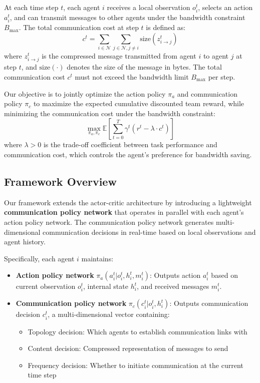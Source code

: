 \documentclass[10pt, twocolumn]{IEEEtran}
\begin{document}
At each time step $t$, each agent $i$ receives a local observation $o_i^t$, selects an action $a_i^t$, and can transmit messages to other agents under the bandwidth constraint $B_{\max}$. The total communication cost at step $t$ is defined as:
\begin{equation}
c^t = \sum_{i \in \mathcal{N}} \sum_{j \in \mathcal{N}, j \neq i} \text{size}(z_{i \to j}^t)
\end{equation}
where $z_{i \to j}^t$ is the compressed message transmitted from agent $i$ to agent $j$ at step $t$, and $\text{size}(\cdot)$ denotes the size of the message in bytes. The total communication cost $c^t$ must not exceed the bandwidth limit $B_{\max}$ per step.

Our objective is to jointly optimize the action policy $\pi_a$ and communication policy $\pi_c$ to maximize the expected cumulative discounted team reward, while minimizing the communication cost under the bandwidth constraint:
\begin{equation}
\max_{\pi_a, \pi_c} \mathbb{E}\left[\sum_{t=0}^{T} \gamma^t \left(r^t - \lambda \cdot c^t\right)\right]
\end{equation}
where $\lambda > 0$ is the trade-off coefficient between task performance and communication cost, which controls the agent's preference for bandwidth saving.

\subsection{Framework Overview}
Our framework extends the actor-critic architecture by introducing a lightweight \textbf{communication policy network} that operates in parallel with each agent's action policy network. The communication policy network generates multi-dimensional communication decisions in real-time based on local observations and agent history.

Specifically, each agent $i$ maintains:
\begin{itemize}
    \item \textbf{Action policy network} $\pi_a(a_i^t | o_i^t, h_i^t, m_i^t)$: Outputs action $a_i^t$ based on current observation $o_i^t$, internal state $h_i^t$, and received messages $m_i^t$.
    
    \item \textbf{Communication policy network} $\pi_c(c_i^t | o_i^t, h_i^t)$: Outputs communication decision $c_i^t$, a multi-dimensional vector containing:
    \begin{itemize}
        \item Topology decision: Which agents to establish communication links with
        \item Content decision: Compressed representation of messages to send
        \item Frequency decision: Whether to initiate communication at the current time step
    \end{itemize}
\end{itemize}
\end{document}
